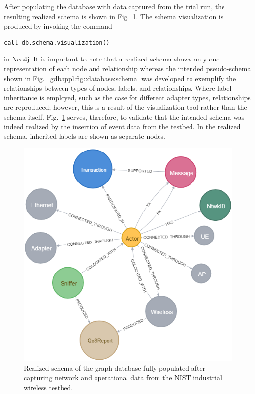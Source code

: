 After populating the database with data captured from the trial run, the resulting realized schema is shown in Fig.~\ref{gdbappl:fig::real-schema}. The schema visualization is produced by invoking the command

\begin{lstlisting}
call db.schema.visualization()
\end{lstlisting} 
in Neo4j. It is important to note that a realized schema shows only one representation of each node and relationship whereas the intended pseudo-schema shown in Fig.~\ref{gdbappl:fig::database:schema} was developed to exemplify the relationships between types of nodes, labels, and relationships. Where label inheritance is employed, such as the case for different adapter types, relationships are reproduced; however, this is a result of the visualization tool rather than the schema itself.  Fig.~\ref{gdbappl:fig::real-schema} serves, therefore, to validate that the intended schema was indeed realized by the insertion of event data from the testbed. In the realized schema, inherited labels are shown as separate nodes.

\begin{figure}
    \centering
    \includegraphics[width=0.99\columnwidth]{./chapter-gdb-appl/figures/database/graph_schema.png}
    \caption{Realized schema of the graph database fully populated after capturing network and operational data from the NIST industrial wireless testbed. }
    \label{gdbappl:fig::real-schema}
\end{figure}

